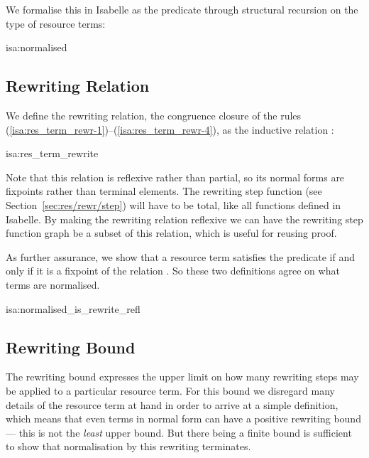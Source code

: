\documentclass[class=smolathesis,crop=false]{standalone}
\begin{document}
We formalise this in Isabelle as the predicate  through structural recursion on the type of resource terms:
\begin{isadef}{isa:normalised}
  
\end{isadef}

\subsection{Rewriting Relation}
\label{sec:res/rewr/rel}

We define the rewriting relation, the congruence closure of the rules (\ref{isa:res_term_rewr-1})--(\ref{isa:res_term_rewr-4}), as the inductive relation :

\begin{isadef}{isa:res_term_rewrite}
  
\end{isadef}

Note that this relation is reflexive rather than partial, so its normal forms are fixpoints rather than terminal elements.
The rewriting step function (see Section~\ref{sec:res/rewr/step}) will have to be total, like all functions defined in Isabelle.
By making the rewriting relation reflexive we can have the rewriting step function graph be a subset of this relation, which is useful for reusing proof.

As further assurance, we show that a resource term satisfies the predicate  if and only if it is a fixpoint of the relation .
So these two definitions agree on what terms are normalised.

\cbstart
\begin{isalemma}{isa:normalised_is_rewrite_refl}
  
\end{isalemma}
\cbend

\subsection{Rewriting Bound}
\label{sec:res/rewr/bound}

The rewriting bound expresses the upper limit on how many rewriting steps may be applied to a particular resource term.
For this bound we disregard many details of the resource term at hand in order to arrive at a simple definition, which means that even terms in normal form can have a positive rewriting bound --- this is not the \emph{least} upper bound.
But there being a finite bound is sufficient to show that normalisation by this rewriting terminates.
\end{document}
